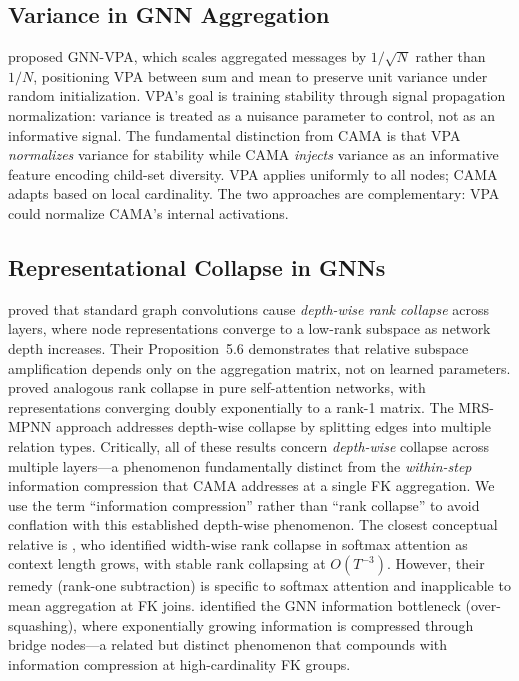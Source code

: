 \documentclass[11pt,letterpaper]{article}
\begin{document}
\subsection{Variance in GNN Aggregation}

\citet{Schneckenreiter2024} proposed GNN-VPA, which scales aggregated messages by $1/\sqrt{N}$ rather than $1/N$, positioning VPA between sum and mean to preserve unit variance under random initialization. VPA's goal is training stability through signal propagation normalization: variance is treated as a nuisance parameter to control, not as an informative signal. The fundamental distinction from CAMA is that VPA \emph{normalizes} variance for stability while CAMA \emph{injects} variance as an informative feature encoding child-set diversity. VPA applies uniformly to all nodes; CAMA adapts based on local cardinality. The two approaches are complementary: VPA could normalize CAMA's internal activations.

\subsection{Representational Collapse in GNNs}

\citet{Roth2024a} proved that standard graph convolutions cause \emph{depth-wise rank collapse} across layers, where node representations converge to a low-rank subspace as network depth increases. Their Proposition~5.6 demonstrates that relative subspace amplification depends only on the aggregation matrix, not on learned parameters. \citet{Dong2021} proved analogous rank collapse in pure self-attention networks, with representations converging doubly exponentially to a rank-1 matrix. The MRS-MPNN approach \citep{Roth2024b} addresses depth-wise collapse by splitting edges into multiple relation types. Critically, all of these results concern \emph{depth-wise} collapse across multiple layers---a phenomenon fundamentally distinct from the \emph{within-step} information compression that CAMA addresses at a single FK aggregation. We use the term ``information compression'' rather than ``rank collapse'' to avoid conflation with this established depth-wise phenomenon. The closest conceptual relative is \citet{NaitSaada2024}, who identified width-wise rank collapse in softmax attention as context length grows, with stable rank collapsing at $O(T^{-3})$. However, their remedy (rank-one subtraction) is specific to softmax attention and inapplicable to mean aggregation at FK joins. \citet{Alon2021} identified the GNN information bottleneck (over-squashing), where exponentially growing information is compressed through bridge nodes---a related but distinct phenomenon that compounds with information compression at high-cardinality FK groups.
\end{document}
